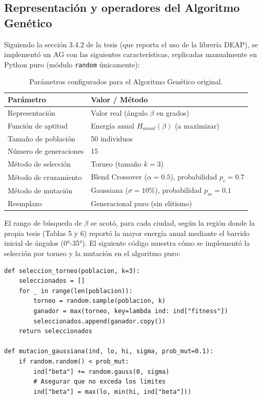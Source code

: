 \documentclass[11pt,a4paper]{article}
\begin{document}
\subsection{Representación y operadores del Algoritmo Genético}

Siguiendo la sección 3.4.2 de la tesis (que reporta el uso de la librería
DEAP), se implementó un AG con las siguientes características, replicadas
manualmente en Python puro (módulo \texttt{random} únicamente):

\begin{table}[H]
\centering
\small
\caption{Parámetros configurados para el Algoritmo Genético original.}
\begin{tabular}{ll}
\toprule
\textbf{Parámetro} & \textbf{Valor / Método} \\
\midrule
Representación & Valor real (ángulo $\beta$ en grados) \\
Función de aptitud & Energía anual $H_{anual}(\beta)$ (a maximizar) \\
Tamaño de población & 50 individuos \\
Número de generaciones & 15 \\
Método de selección & Torneo (tamaño $k=3$) \\
Método de cruzamiento & Blend Crossover ($\alpha=0.5$), probabilidad $p_c=0.7$ \\
Método de mutación & Gaussiana ($\sigma=10\%$), probabilidad $p_m=0.1$ \\
Reemplazo & Generacional puro (sin elitismo) \\
\bottomrule
\end{tabular}
\end{table}

El rango de búsqueda de $\beta$ se acotó, para cada ciudad, según la región
donde la propia tesis (Tablas 5 y 6) reportó la mayor energía anual mediante
el barrido inicial de ángulos (0°-35°). El siguiente código muestra cómo se
implementó la selección por torneo y la mutación en el algoritmo puro:

\begin{lstlisting}
def seleccion_torneo(poblacion, k=3):
    seleccionados = []
    for _ in range(len(poblacion)):
        torneo = random.sample(poblacion, k)
        ganador = max(torneo, key=lambda ind: ind["fitness"])
        seleccionados.append(ganador.copy())
    return seleccionados

def mutacion_gaussiana(ind, lo, hi, sigma, prob_mut=0.1):
    if random.random() < prob_mut:
        ind["beta"] += random.gauss(0, sigma)
        # Asegurar que no exceda los limites
        ind["beta"] = max(lo, min(hi, ind["beta"]))
\end{lstlisting}
\end{document}

